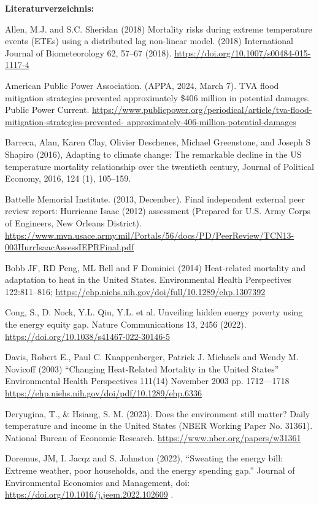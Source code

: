 \documentclass[12pt,paper=a4,DIV=12,parskip=never,chapterprefix=false,headings=standardclasses]{scrreprt}
\begin{document}
\vfill
\noindent\textbf{Literaturverzeichnis:}

\begingroup
\parindent=0pt
\everypar{\hangindent=2em\hangafter=1\relax}

Allen, M.J. and S.C. Sheridan (2018) Mortality risks during extreme temperature events (ETEs) using a
distributed lag non-linear model. (2018) International Journal of Biometeorology 62, 57–67 (2018).
\url{https://doi.org/10.1007/s00484-015-1117-4}

American Public Power Association. (APPA, 2024, March 7). TVA flood mitigation strategies prevented
approximately \$406 million in potential damages. Public Power Current.
\url{https://www.publicpower.org/periodical/article/tva-flood-mitigation-strategies-prevented-
approximately-406-million-potential-damages}

Barreca, Alan, Karen Clay, Olivier Deschenes, Michael Greenstone, and Joseph S Shapiro (2016), Adapting
to climate change: The remarkable decline in the US temperature mortality relationship over the
twentieth century, Journal of Political Economy, 2016, 124 (1), 105–159.

Battelle Memorial Institute. (2013, December). Final independent external peer review report: Hurricane
Isaac (2012) assessment (Prepared for U.S. Army Corps of Engineers, New Orleans District).
\url{https://www.mvn.usace.army.mil/Portals/56/docs/PD/PeerReview/TCN13-
003HurrIsaacAssessIEPRFinal.pdf}

Bobb JF, RD Peng, ML Bell and F Dominici (2014) Heat-related mortality and adaptation to heat in the
United States. Environmental Health Perspectives 122:811–816;
\url{https://ehp.niehs.nih.gov/doi/full/10.1289/ehp.1307392}

Cong, S., D. Nock, Y.L. Qiu, Y.L. et al. Unveiling hidden energy poverty using the energy equity
gap. Nature Communications 13, 2456 (2022). \url{https://doi.org/10.1038/s41467-022-30146-5}

Davis, Robert E., Paul C. Knappenberger, Patrick J. Michaels and Wendy M. Novicoff (2003) “Changing
Heat-Related Mortality in the United States” Environmental Health Perspectives 111(14) November
2003 pp. 1712—1718 \url{https://ehp.niehs.nih.gov/doi/pdf/10.1289/ehp.6336}

Deryugina, T., \& Hsiang, S. M. (2023). Does the environment still matter? Daily temperature and income
in the United States (NBER Working Paper No. 31361). National Bureau of Economic Research.
\url{https://www.nber.org/papers/w31361}

Doremus, JM, I. Jacqz and S. Johnston (2022), “Sweating the energy bill: Extreme weather, poor
households, and the energy spending gap.” Journal of Environmental Economics and Management,
doi: \url{https://doi.org/10.1016/j.jeem.2022.102609} .
\end{document}
